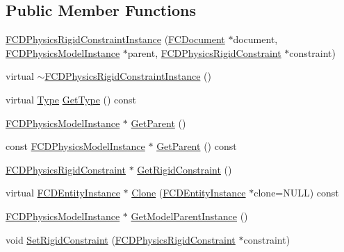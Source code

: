 \subsection*{Public Member Functions}
\begin{DoxyCompactItemize}
\item 
\hyperlink{classFCDPhysicsRigidConstraintInstance_a40ddfb3bb3bdcf04e596d495d8c3bb8a}{FCDPhysicsRigidConstraintInstance} (\hyperlink{classFCDocument}{FCDocument} $\ast$document, \hyperlink{classFCDPhysicsModelInstance}{FCDPhysicsModelInstance} $\ast$parent, \hyperlink{classFCDPhysicsRigidConstraint}{FCDPhysicsRigidConstraint} $\ast$constraint)
\item 
virtual \hyperlink{classFCDPhysicsRigidConstraintInstance_a5559af27968bac8addd9e117e2b98d3b}{$\sim$FCDPhysicsRigidConstraintInstance} ()
\item 
virtual \hyperlink{classFCDEntityInstance_a82e95eec7d9242bbedb336b0d35b59d3}{Type} \hyperlink{classFCDPhysicsRigidConstraintInstance_ae97992fcec6d82605322582fb6c89a4a}{GetType} () const 
\item 
\hyperlink{classFCDPhysicsModelInstance}{FCDPhysicsModelInstance} $\ast$ \hyperlink{classFCDPhysicsRigidConstraintInstance_acc8e39647944f00cd5e7807b348ef1d2}{GetParent} ()
\item 
const \hyperlink{classFCDPhysicsModelInstance}{FCDPhysicsModelInstance} $\ast$ \hyperlink{classFCDPhysicsRigidConstraintInstance_a1e03bfe2fc403659f16cc8c1f2d0e794}{GetParent} () const 
\item 
\hyperlink{classFCDPhysicsRigidConstraint}{FCDPhysicsRigidConstraint} $\ast$ \hyperlink{classFCDPhysicsRigidConstraintInstance_a43abd53271eff58bd7b7b58644d69193}{GetRigidConstraint} ()
\item 
virtual \hyperlink{classFCDEntityInstance}{FCDEntityInstance} $\ast$ \hyperlink{classFCDPhysicsRigidConstraintInstance_aade5baf4826fb9421eecb7734df02b79}{Clone} (\hyperlink{classFCDEntityInstance}{FCDEntityInstance} $\ast$clone=NULL) const 
\item 
\hyperlink{classFCDPhysicsModelInstance}{FCDPhysicsModelInstance} $\ast$ \hyperlink{classFCDPhysicsRigidConstraintInstance_af426dee2fe40d1413b310526a0dfc569}{GetModelParentInstance} ()
\item 
void \hyperlink{classFCDPhysicsRigidConstraintInstance_abac99aa840c2fb2b1663ed98681b38b1}{SetRigidConstraint} (\hyperlink{classFCDPhysicsRigidConstraint}{FCDPhysicsRigidConstraint} $\ast$constraint)
\end{DoxyCompactItemize}


